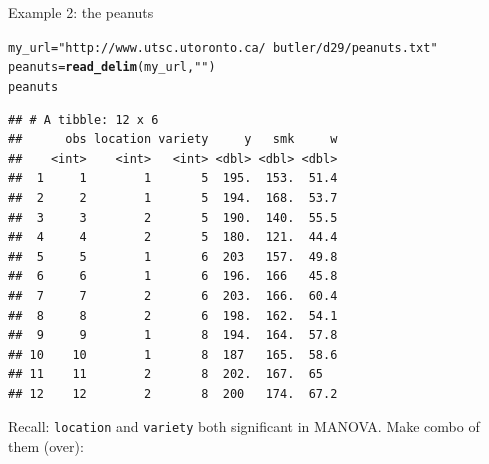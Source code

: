 \documentclass[unknownkeysallowed]{beamer}\usepackage[]{graphicx}\usepackage[]{color}
\makeatletter
\newcommand{\hlstr}[1]{\textcolor[rgb]{0.192,0.494,0.8}{#1}}%
\newcommand{\hlstd}[1]{\textcolor[rgb]{0.345,0.345,0.345}{#1}}%
\newcommand{\hlkwb}[1]{\textcolor[rgb]{0.69,0.353,0.396}{#1}}%
\newcommand{\hlkwd}[1]{\textcolor[rgb]{0.737,0.353,0.396}{\textbf{#1}}}%
\newenvironment{kframe}{%
 \def\at@end@of@kframe{}%
 \ifinner\ifhmode%
  \def\at@end@of@kframe{\end{minipage}}%
  \begin{minipage}{\columnwidth}%
 \fi\fi%
 \def\FrameCommand##1{\hskip\@totalleftmargin \hskip-\fboxsep
 \colorbox{shadecolor}{##1}\hskip-\fboxsep
     \hskip-\linewidth \hskip-\@totalleftmargin \hskip\columnwidth}%
 \MakeFramed {\advance\hsize-\width
   \@totalleftmargin\z@ \linewidth\hsize
   \@setminipage}}%
 {\par\unskip\endMakeFramed%
 \at@end@of@kframe}
\newenvironment{knitrout}{}{} %
\makeatother
\begin{document}
% 
%
%  
%
%  
%
%
%    
%  
%  

\begin{frame}[fragile]{Example 2: the peanuts}

\begin{knitrout}\footnotesize
{}\color{fgcolor}\begin{kframe}
\begin{alltt}
\hlstd{my_url}\hlkwb{=}\hlstr{"http://www.utsc.utoronto.ca/~butler/d29/peanuts.txt"}
\hlstd{peanuts}\hlkwb{=}\hlkwd{read_delim}\hlstd{(my_url,}\hlstr{" "}\hlstd{)}
\hlstd{peanuts}
\end{alltt}
\begin{verbatim}
## # A tibble: 12 x 6
##      obs location variety     y   smk     w
##    <int>    <int>   <int> <dbl> <dbl> <dbl>
##  1     1        1       5  195.  153.  51.4
##  2     2        1       5  194.  168.  53.7
##  3     3        2       5  190.  140.  55.5
##  4     4        2       5  180.  121.  44.4
##  5     5        1       6  203   157.  49.8
##  6     6        1       6  196.  166   45.8
##  7     7        2       6  203.  166.  60.4
##  8     8        2       6  198.  162.  54.1
##  9     9        1       8  194.  164.  57.8
## 10    10        1       8  187   165.  58.6
## 11    11        2       8  202.  167.  65  
## 12    12        2       8  200   174.  67.2
\end{verbatim}
\end{kframe}
\end{knitrout}

Recall: \texttt{location} and \texttt{variety} both significant in
MANOVA. Make combo of them (over):

  
\end{frame}
\end{document}
